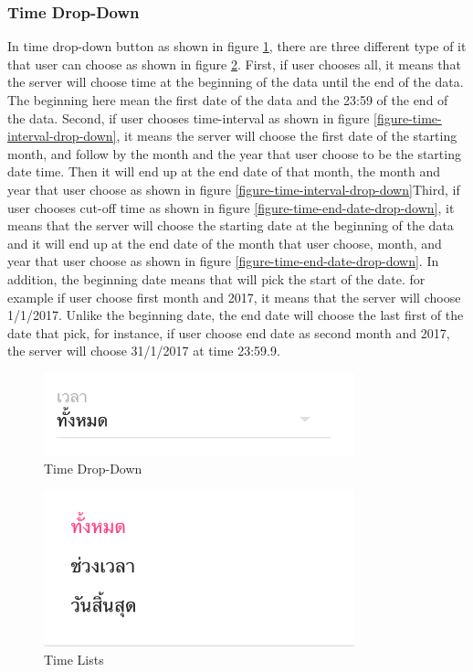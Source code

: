 \subsubsection{Time Drop-Down}  

    
    In time drop-down button as shown in figure \ref{figure-time-drop-down}, there are three different type of it that user can choose as shown in figure \ref{figure-time-lists}. First, if user chooses all, it means that the server will choose time at the beginning of the data until the end of the data. The beginning here mean the first date of the data and the 23:59 of the end of the data. Second, if user chooses time-interval as shown in figure \ref{figure-time-interval-drop-down}, it means the server will choose the first date of the starting month, and follow by the month and the year that user choose to be the starting date time. Then it will end up at the end date of that month, the month and year that user choose as shown in figure \ref{figure-time-interval-drop-down}Third, if user chooses cut-off time as shown in figure  \ref{figure-time-end-date-drop-down}, it means that the server will choose the starting date at the beginning of the data and it will end up at the end date of the month that user choose, month, and year that user choose as shown in figure \ref{figure-time-end-date-drop-down}. In addition, the beginning date means that will pick the start of the date. for example if user choose first month and 2017, it means that the server will choose 1/1/2017. Unlike the beginning date, the end date will choose the last first of the date that pick, for instance, if user choose end date as second month and 2017, the server will choose 31/1/2017 at time 23:59.9.
    

    \FloatBarrier
        \begin{figure}[h!]
            \centering
        		\includegraphics[width=9cm]{images/chapter-06/time-all.png}
            	\caption{Time Drop-Down}
        		\label{figure-time-drop-down}
        \end{figure}
    \FloatBarrier
    
    \FloatBarrier
        \begin{figure}[h!]
            \centering
        		\includegraphics[width=9cm]{images/chapter-06/time-lists.png}
            	\caption{Time Lists}
        		\label{figure-time-lists}
        \end{figure}
    \FloatBarrier
    
